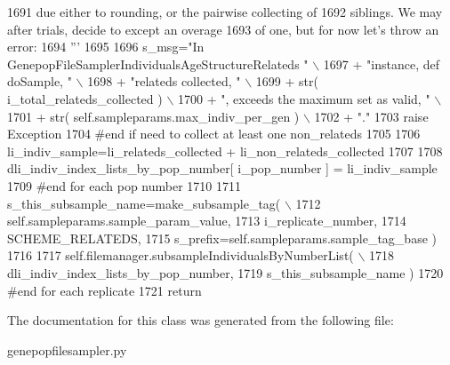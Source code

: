 \begin{DoxyCode}
1691 \textcolor{stringliteral}{                    due either to rounding, or the pairwise collecting of}
1692 \textcolor{stringliteral}{                    siblings.  We may after trials, decide to except an overage}
1693 \textcolor{stringliteral}{                    of one, but for now let's throw an error:}
1694 \textcolor{stringliteral}{                    '''}
1695 
1696                     s\_msg=\textcolor{stringliteral}{"In GenepopFileSamplerIndividualsAgeStructureRelateds "} \(\backslash\)
1697                                 + \textcolor{stringliteral}{"instance, def doSample, "}  \(\backslash\)
1698                                 + \textcolor{stringliteral}{"relateds collected, "} \(\backslash\)
1699                                 + str( i\_total\_relateds\_collected ) \(\backslash\)
1700                                 + \textcolor{stringliteral}{", exceeds the maximum set as valid, "} \(\backslash\)
1701                                 + str( self.sampleparams.max\_indiv\_per\_gen ) \(\backslash\)
1702                                 + \textcolor{stringliteral}{"."}
1703                     \textcolor{keywordflow}{raise} Exception
1704                 \textcolor{comment}{#end if need to collect at least one non\_relateds}
1705 
1706                 li\_indiv\_sample=li\_relateds\_collected + li\_non\_relateds\_collected
1707 
1708                 dli\_indiv\_index\_lists\_by\_pop\_number[ i\_pop\_number ] = li\_indiv\_sample
1709             \textcolor{comment}{#end for each pop number}
1710 
1711             s\_this\_subsample\_name=make\_subsample\_tag( \(\backslash\)
1712                                 self.sampleparams.sample\_param\_value, 
1713                                 i\_replicate\_number, 
1714                                 SCHEME\_RELATEDS,
1715                                 s\_prefix=self.sampleparams.sample\_tag\_base )
1716 
1717             self.filemanager.subsampleIndividualsByNumberList( \(\backslash\)
1718                                     dli\_indiv\_index\_lists\_by\_pop\_number, 
1719                                                     s\_this\_subsample\_name )
1720         \textcolor{comment}{#end for each replicate}
1721         \textcolor{keywordflow}{return}
\end{DoxyCode}


The documentation for this class was generated from the following file\+:\begin{DoxyCompactItemize}
\item 
genepopfilesampler.\+py\end{DoxyCompactItemize}

